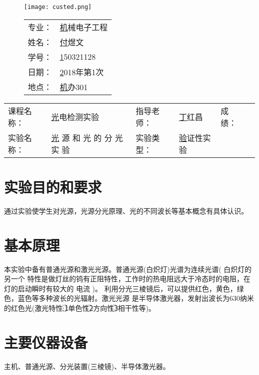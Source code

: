 \documentclass{zjureport}
\makeatletter
\newcommand\dlmu[2][4cm]{\hskip1pt\underline{\hb@xt@ #1{\hss#2\hss}}\hskip3pt}
\newcommand{\major}{机械电子工程}
\newcommand{\name}{付煜文}
\newcommand{\stuid}{150321128}
\newcommand{\newdate}{2018年第1次}
\newcommand{\loc}{机办301}
\newcommand{\course}{光电检测实验}
\newcommand{\tutor}{丁红昌}
\newcommand{\newtitle}{光 源 和 光 的 分 光 实 验}
\newcommand{\exptype}{验证性实验}
\makeatother
\begin{document}
		\thispagestyle{plain}         %

\begin{figure}[h]
  \begin{minipage}{0.6\linewidth}
    \centerline{\texttt{[image: custed.png]}}
  \end{minipage}
  \hfill
  \begin{minipage}{.4\linewidth}
    \raggedleft
    \begin{tabular*}{.8\linewidth}{ll}
      专业： & \underline\major   \\
      姓名： & \underline\name    \\
      学号： & \underline\stuid   \\
      日期： & \underline\newdate \\
      地点： & \underline\loc
    \end{tabular*}
  \end{minipage}
\end{figure}

\begin{table}[!htbp]
  \centering
  \begin{tabular*}{\linewidth}{llllll}
    课程名称： & \underline\course   & 指导老师： & \underline\tutor   & 成绩：       &  \dlmu[1.5cm]{} \\
    实验名称： & \underline\newtitle & 实验类型： & \underline\exptype 
  \end{tabular*}
\end{table}

\section{实验目的和要求}
	{通过实验使学生对光源，光源分光原理、光的不同波长等基本概念有具体认识。}
\section{基本原理}
	{本实验中备有普通光源和激光光源。普通光源(白炽灯)光谱为连续光谱( 白炽灯的另一个
		特性是做灯丝的钨有正阻特性，工作时的热电阻远大于冷态时的电阻，在灯的启动瞬时有较大的
		电流 )。 利用分光三棱镜后，可以提供红色，黄色，绿色，蓝色等多种波长的光辐射。激光光源
		是半导体激光器，发射出波长为630纳米的红色光(激光特性:\textcircled{1}单色性\textcircled{2}方向性\textcircled{3}相干性等)。}

\section{主要仪器设备}
  {主机、普通光源、分光装置(三棱镜)、半导体激光器。}
\end{document}
